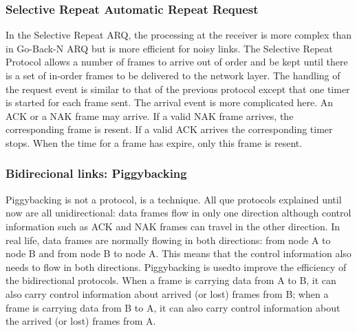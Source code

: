 \subsubsection{Selective Repeat Automatic Repeat Request}
In the Selective Repeat ARQ, the processing at the receiver is more complex than in Go-Back-N ARQ but is more efficient for noisy links. The Selective Repeat Protocol allows a number of frames to arrive out of order and be kept until there is a set of in-order frames to be
delivered to the network layer. The handling of the request event is similar to that of the previous protocol except
that one timer is started for each frame sent. The arrival event is more complicated here. An ACK
or a NAK frame may arrive. If a valid NAK frame arrives, the corresponding frame is resent. If a valid ACK arrives the corresponding timer stops. When the time for a frame has expire, only this frame is resent.
\subsubsection{Bidirecional links: Piggybacking}
Piggybacking is not a protocol, is a technique. All que protocols explained until now are all unidirectional: data frames flow
in only one direction although control information such as ACK and NAK frames can
travel in the other direction. In real life, data frames are normally flowing in both directions:
from node A to node B and from node B to node A. This means that the control
information also needs to flow in both directions. Piggybacking is usedto improve the efficiency of the bidirectional protocols. When a frame is carrying
data from A to B, it can also carry control information about arrived (or lost) frames
from B; when a frame is carrying data from B to A, it can also carry control information
about the arrived (or lost) frames from A.
